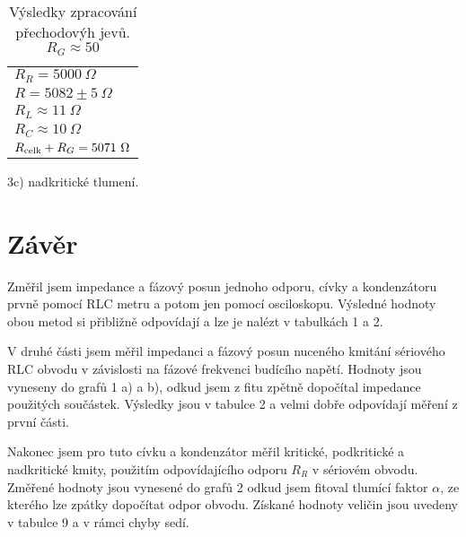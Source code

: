 \documentclass[a4paper,11pt]{article}
\begin{document}
\begin{table}[htpb]
\begin{minipage}[b]{.25\linewidth}
\begin{tabular}{l}
            $R_R=5000\ \Omega$\\
            $R=5082 \pm 5\ \Omega$\\
            $ R_L \approx 11\ \Omega $ \\
            $ R_C \approx 10\ \Omega $ \\
            $R_{\rm celk}+R_G=5071\ \Omega$\\
            \hline \hline
        \end{tabular}
        \captionsetup{labelformat=empty}
        \caption{3c) nadkritické tlumení.}
    \end{minipage}
    \hfill
    \caption{Výsledky zpracování přechodovýh jevů. $ R_G \approx 50 $  }
\end{table}

\section{Závěr}

Změřil jsem impedance a fázový posun jednoho odporu, cívky a kondenzátoru prvně pomocí RLC metru a potom jen pomocí osciloskopu. Výsledné hodnoty obou metod si přibližně odpovídají a lze je nalézt v tabulkách 1 a 2.

V druhé části jsem měřil impedanci a fázový posun nuceného kmitání sériového RLC obvodu v závislosti na fázové frekvenci budícího napětí. Hodnoty jsou vyneseny do grafů 1 a) a b), odkud jsem z fitu zpětně dopočítal impedance použitých součástek. Výsledky jsou v tabulce 2 a velmi dobře odpovídají měření z první části.

Nakonec jsem pro tuto cívku a kondenzátor měřil kritické, podkritické a nadkritické kmity, použitím odpovídajícího odporu $ R_R $ v sériovém obvodu. Změřené hodnoty jsou vynesené do grafů 2 odkud jsem fitoval tlumící faktor $ \alpha $, ze kterého lze zpátky dopočítat odpor obvodu. Získané hodnoty veličin jsou uvedeny v tabulce 9 a v rámci chyby sedí.
\end{document}
